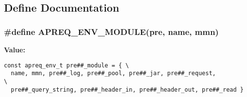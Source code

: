 \subsection{Define Documentation}
\subsubsection{\setlength{\rightskip}{0pt plus 5cm}\#define APREQ\_\-ENV\_\-MODULE(pre, name, mmn)}\label{group__ENV_a15}


{\bf Value:}

\footnotesize\begin{verbatim}const apreq_env_t pre##_module = { \
  name, mmn, pre##_log, pre##_pool, pre##_jar, pre##_request,               \
  pre##_query_string, pre##_header_in, pre##_header_out, pre##_read }
\end{verbatim}\normalsize 
